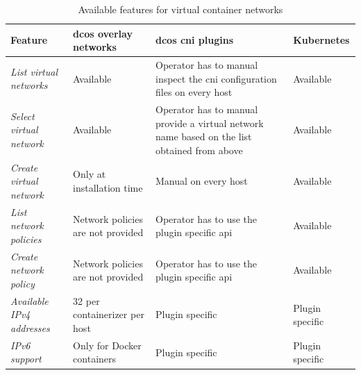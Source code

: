 \begin{table}[ht]
\centering
\renewcommand*{\arraystretch}{1.4}
\begin{tabular}{|p{4cm}|p{2.5cm}|p{4cm}|p{2.5cm}|}\hline 
 \textbf{Feature} & \textbf{\gls{dcos} overlay networks} & \textbf{\gls{dcos} \gls{cni} plugins} & \textbf{Kubernetes}\\ \hline
 \textit{List virtual networks} & Available & Operator has to manual inspect the \gls{cni} configuration files on every host & Available \\ \hline
 \textit{Select virtual network} & Available & Operator has to manual provide a virtual network name based on the list obtained from above & Available \\ \hline
 \textit{Create virtual network} & Only at installation time & Manual on every host & Available \\ \hline
 \textit{List network policies} & Network policies are not provided & Operator has to use the plugin specific \gls{api}  & Available \\ \hline
 \textit{Create network policy} & Network policies are not provided & Operator has to use the plugin specific \gls{api} & Available \\ \hline
 \textit{Available IPv4 addresses} & 32 per containerizer per host & Plugin specific & Plugin specific \\ \hline
 \textit{IPv6 support} & Only for Docker containers & Plugin specific & Plugin specific \\ \hline
\end{tabular}
\caption{Available features for virtual container networks}
\label{tab:problems}
\end{table}
